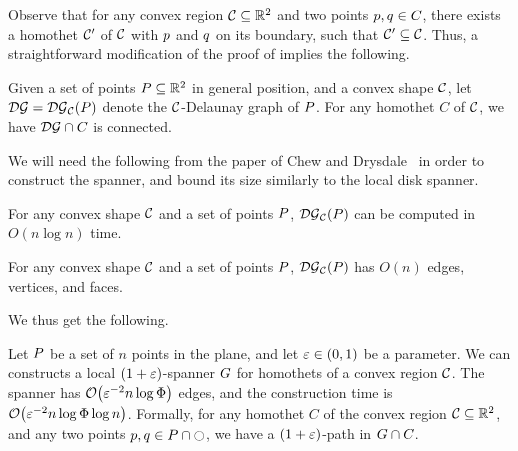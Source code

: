 \documentclass[12pt]{article}%
\begin{document}
Observe that for any convex region $\mathcal{C}\subseteq \mathbb{R}^2$ and two points
$p,q \in C$, there exists a homothet $\mathcal{C}'$ of $\mathcal{C}$ with $p$
and $q$ on its boundary, such that $\mathcal{C}'\subseteq \mathcal{C}$. Thus, a
straightforward modification of the proof of 
implies the following.


\begin{claim}
    Given a set of points $P \subseteq \mathbb{R}^2$ in general position,
    and a convex shape $\mathcal{C}$, let $\mathcal{DG} = \mathcal{DG}_{\mathcal{C}}(P)$ denote the
    $\mathcal{C}$-Delaunay graph of $P$. For any homothet $C$ of $\mathcal{C}$, we
    have $\mathcal{DG} \cap {C}$ is connected.
\end{claim}




We will need the following from the paper of Chew and
Drysdale~\cite{cd-vdbcdf-85} in order to construct the spanner, and
bound its size similarly to the local disk spanner.

\begin{theorem}
    For any convex shape $\mathcal{C}$ and a set of points $P$,
    $\mathcal{DG}_{\mathcal{C}}(P)$ can be computed in $O(n \log n)$ time.
\end{theorem}

\begin{lemma}
    For any convex shape $\mathcal{C}$ and a set of points $P$,
    $\mathcal{DG}_{\mathcal{C}}(P)$ has $O(n)$ edges, vertices, and faces.
\end{lemma}


We thus get the following.

\begin{theorem}
    Let $P$ be a set of $n$ points in the plane, and let
    $\varepsilon \in (0,1)$ be a parameter. We can constructs a local
    $(1+\varepsilon)$-spanner $G$ for homothets of a convex region
    $\mathcal{C}$. The spanner has $\Of\pth{ \eps^{-2} n\log \spread }$ edges,
    and the construction time is
    $\Of\pth{ \eps^{-2} n\log \spread \log n }$.  Formally, for any
    homothet $C$ of the convex region $\mathcal{C}\subseteq \mathbb{R}^2$, and any
    two points $p, q \in P \cap \ocircle$, we have a
    $(1+\varepsilon)$-path in $G \cap {C}$.
\end{theorem}
\end{document}
